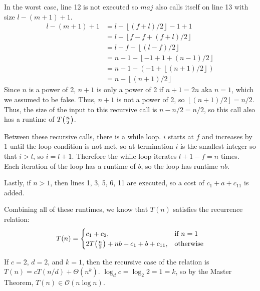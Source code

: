 \documentclass[12pt]{article}
\newcommand{\BigO}{\mathcal{O}}
\newcommand{\cleft}{\mathopen{}\mathclose\bgroup\left}
\newcommand{\cright}{\aftergroup\egroup\right}
\newcommand{\floor}[1]{\left\lfloor #1 \right\rfloor}
\begin{document}
In the worst case, line 12 is not executed so $maj$ also calls itself on line 13 with size $l - (m + 1) + 1$. 
\begin{align*}
    l - (m + 1) + 1 &= l - \floor{(f + l) / 2} - 1 + 1 \\
    &= l - \floor{f - f + (f + l) / 2} \\
    &= l - f - \floor{(l - f) / 2} \\
    &= n - 1 - \floor{-1 + 1 + (n - 1) / 2} \\
    &= n - 1 - \left(-1 + \floor{(n + 1) / 2}\right) \\
    &= n - \floor{(n + 1) / 2}
\end{align*}
Since $n$ is a power of 2, $n + 1$ is only a power of 2 if $n + 1 = 2n$ aka $n = 1$, which we assumed to be false. Thus, $n + 1$ is not a power of 2, so $\floor{(n + 1) / 2} = n / 2$. Thus, the size of the input to this recursive call is $n - n/2 = n/2$, so this call also has a runtime of $T\cleft(\frac{n}{2}\cright)$.

Between these recursive calls, there is a while loop. $i$ starts at $f$ and increases by 1 until the loop condition is not met, so at termination $i$ is the smallest integer so that $i > l$, so $i = l + 1$. Therefore the while loop iterates $l + 1 - f = n$ times. Each iteration of the loop has a runtime of $b$, so the loop has runtime $nb$.

Lastly, if $n > 1$, then lines 1, 3, 5, 6, 11 are executed, so a cost of $c_1 + a + c_{11}$ is added.

Combining all of these runtimes, we know that $T(n)$ satisfies the recurrence relation:
\[
T(n) = \begin{cases}
c_1 + c_2, &\text{if } n = 1 \\
2T\cleft(\frac{n}{2}\cright) + nb + c_1 + b + c_{11}, &\text{otherwise}
\end{cases}
\]

\noindent If $c = 2$, $d = 2$, and $k = 1$, then the recursive case of the relation is $T(n) = cT(n/d) + \Theta(n^k)$. $\log_d c = \log_2 2 = 1 = k$, so by the Master Theorem, $T(n) \in \BigO(n \log n)$.
\end{document}
